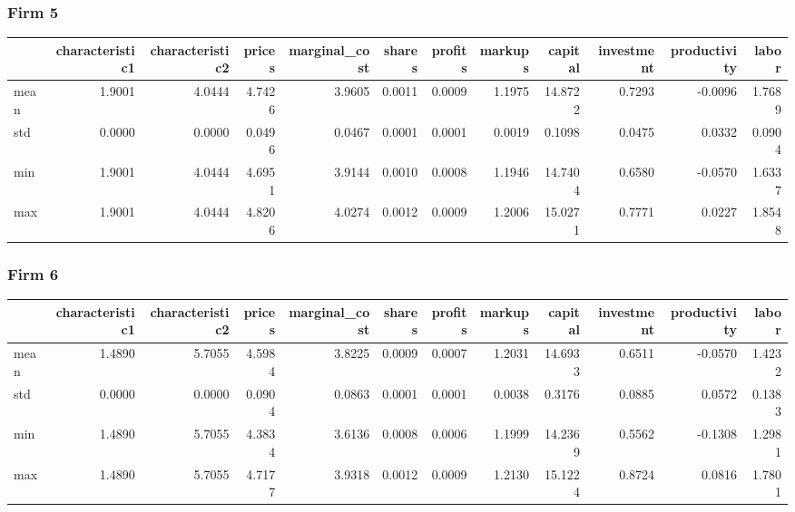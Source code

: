  \subsubsection*{Firm 5}
\begin{tabular}{lrrrrrrrrrrr}
\toprule
{} &  characteristic1 &  characteristic2 &  prices &  marginal\_cost &  shares &  profits &  markups &  capital &  investment &  productivity &  labor \\
\midrule
mean &           1.9001 &           4.0444 &  4.7426 &         3.9605 &  0.0011 &   0.0009 &   1.1975 &  14.8722 &      0.7293 &       -0.0096 & 1.7689 \\
std  &           0.0000 &           0.0000 &  0.0496 &         0.0467 &  0.0001 &   0.0001 &   0.0019 &   0.1098 &      0.0475 &        0.0332 & 0.0904 \\
min  &           1.9001 &           4.0444 &  4.6951 &         3.9144 &  0.0010 &   0.0008 &   1.1946 &  14.7404 &      0.6580 &       -0.0570 & 1.6337 \\
max  &           1.9001 &           4.0444 &  4.8206 &         4.0274 &  0.0012 &   0.0009 &   1.2006 &  15.0271 &      0.7771 &        0.0227 & 1.8548 \\
\bottomrule
\end{tabular}


 \subsubsection*{Firm 6}
\begin{tabular}{lrrrrrrrrrrr}
\toprule
{} &  characteristic1 &  characteristic2 &  prices &  marginal\_cost &  shares &  profits &  markups &  capital &  investment &  productivity &  labor \\
\midrule
mean &           1.4890 &           5.7055 &  4.5984 &         3.8225 &  0.0009 &   0.0007 &   1.2031 &  14.6933 &      0.6511 &       -0.0570 & 1.4232 \\
std  &           0.0000 &           0.0000 &  0.0904 &         0.0863 &  0.0001 &   0.0001 &   0.0038 &   0.3176 &      0.0885 &        0.0572 & 0.1383 \\
min  &           1.4890 &           5.7055 &  4.3834 &         3.6136 &  0.0008 &   0.0006 &   1.1999 &  14.2369 &      0.5562 &       -0.1308 & 1.2981 \\
max  &           1.4890 &           5.7055 &  4.7177 &         3.9318 &  0.0012 &   0.0009 &   1.2130 &  15.1224 &      0.8724 &        0.0816 & 1.7801 \\
\bottomrule
\end{tabular}


